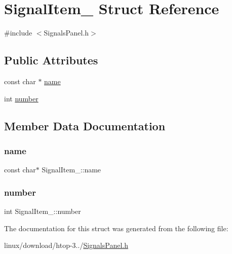 \hypertarget{structSignalItem__}{}\section{Signal\+Item\+\_\+ Struct Reference}
\label{structSignalItem__}


{\ttfamily \#include $<$Signals\+Panel.\+h$>$}

\subsection*{Public Attributes}
\begin{DoxyCompactItemize}
\item 
const char $\ast$ \hyperlink{structSignalItem___a708d2ce96cc7add96e545c84c0087604}{name}
\item 
int \hyperlink{structSignalItem___a4927a9dfc5bb9f2230aaf440cc3cc2a4}{number}
\end{DoxyCompactItemize}


\subsection{Member Data Documentation}
\mbox{\label{structSignalItem___a708d2ce96cc7add96e545c84c0087604}} 
\subsubsection{\texorpdfstring{name}{name}}
{\footnotesize\ttfamily const char$\ast$ Signal\+Item\+\_\+\+::name}

\mbox{\label{structSignalItem___a4927a9dfc5bb9f2230aaf440cc3cc2a4}} 
\subsubsection{\texorpdfstring{number}{number}}
{\footnotesize\ttfamily int Signal\+Item\+\_\+\+::number}



The documentation for this struct was generated from the following file\+:\begin{DoxyCompactItemize}
\item 
linux/download/htop-\/3../\hyperlink{SignalsPanel_8h}{Signals\+Panel.\+h}\end{DoxyCompactItemize}
